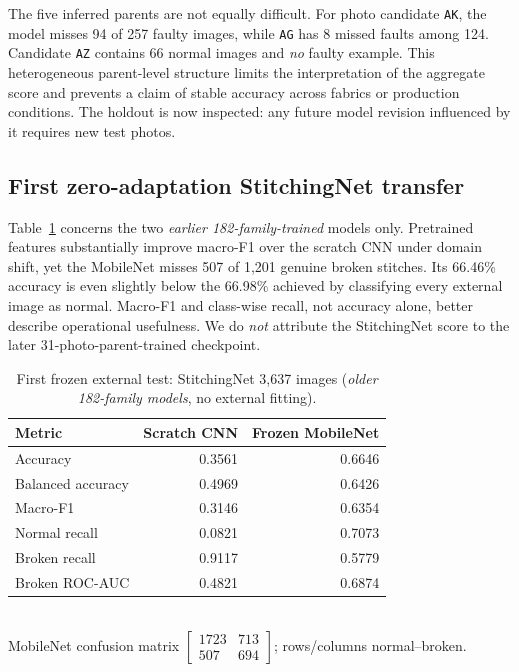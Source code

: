 \documentclass[conference,a4paper]{IEEEtran}
\begin{document}
The five inferred parents are not equally difficult. For photo candidate \texttt{AK}, the model misses 94 of 257 faulty images, while \texttt{AG} has 8 missed faults among 124. Candidate \texttt{AZ} contains 66 normal images and \emph{no} faulty example. This heterogeneous parent-level structure limits the interpretation of the aggregate score and prevents a claim of stable accuracy across fabrics or production conditions. The holdout is now inspected: any future model revision influenced by it requires new test photos.

\subsection{First zero-adaptation StitchingNet transfer}
Table~\ref{tab:external} concerns the two \emph{earlier 182-family-trained} models only. Pretrained features substantially improve macro-F1 over the scratch CNN under domain shift, yet the MobileNet misses 507 of 1,201 genuine broken stitches. Its 66.46\% accuracy is even slightly below the 66.98\% achieved by classifying every external image as normal. Macro-F1 and class-wise recall, not accuracy alone, better describe operational usefulness. We do \emph{not} attribute the StitchingNet score to the later 31-photo-parent-trained checkpoint.

\begin{table}[!t]\centering
\caption{First frozen external test: StitchingNet 3,637 images (\emph{older 182-family models}, no external fitting).}\label{tab:external}
\setlength{\tabcolsep}{2.3pt}\footnotesize
\begin{tabular}{lrr}\toprule
Metric & Scratch CNN & Frozen MobileNet\\\midrule
Accuracy & 0.3561 & 0.6646\\
Balanced accuracy & 0.4969 & 0.6426\\
Macro-F1 & 0.3146 & 0.6354\\
Normal recall & 0.0821 & 0.7073\\
Broken recall & 0.9117 & 0.5779\\
Broken ROC-AUC & 0.4821 & 0.6874\\\bottomrule
\end{tabular}\\[1mm]
\scriptsize MobileNet confusion matrix $\left[\begin{smallmatrix}1723&713\\507&694\end{smallmatrix}\right]$; rows/columns normal--broken.
\end{table}
\end{document}
